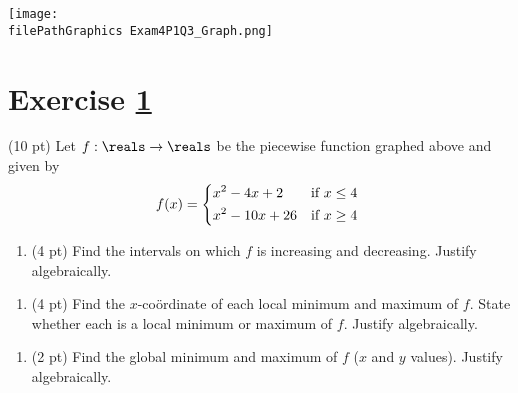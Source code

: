 \spaceSolution{2in}{%
}%





%
%
%
%


\newpage

\begin{center}
\texttt{[image: \\filePathGraphics Exam4P1Q3\_Graph.png]}
\end{center}

\section{Exercise \ref{sec : Math112 Spring2022 FinalExam P1Q3}}
\label{sec : Math112 Spring2022 FinalExam P1Q3}

(10 pt) Let $f : \reals \rightarrow \reals$ be the piecewise function graphed above and given by
\begin{align*}
f(x)
=
\begin{dcases*}
x^{2} - 4 x + 2		&	if $x \leq 4$	\\
x^{2} - 10 x + 26	&	if $x \geq 4$
\end{dcases*}
\end{align*}

\begin{enumerate}[label=(\alph*)]
\item\label{itm : P1Q3a} (4 pt) Find the intervals on which $f$ is increasing and decreasing. Justify algebraically.
\end{enumerate}

\spaceSolution{3in}{%
}%



\newpage

\begin{enumerate}[resume,label=(\alph*)]
\item\label{itm : P1Q3b} (4 pt) Find the $x$-co\"{o}rdinate of each local minimum and maximum of $f$. State whether each is a local minimum or maximum of $f$. Justify algebraically.
\end{enumerate}

\spaceSolution{3.5in}{%
}%



\begin{enumerate}[resume,label=(\alph*)]
\item\label{itm : P1Q3c} (2 pt) Find the global minimum and maximum of $f$ ($x$ and $y$ values). Justify algebraically.
\end{enumerate}

